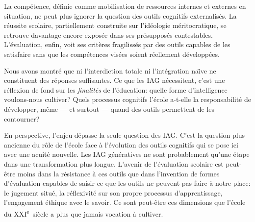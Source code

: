 La comp\'etence, d\'efinie comme mobilisation de ressources internes et externes en situation, ne peut plus ignorer la question des outils cognitifs externalis\'es. 
La r\'eussite scolaire, partiellement construite sur l'id\'eologie m\'eritocratique, se retrouve davantage encore expos\'ee dans ses pr\'esuppos\'es contestables. 
L'\'evaluation, enfin, voit ses crit\`eres fragiliss\'es par des outils capables de les satisfaire sans que les comp\'etences vis\'ees soient r\'eellement d\'evelopp\'ees.

Nous avons montr\'e que ni l'interdiction totale ni l'int\'egration na\"\i ve ne constituent des r\'eponses suffisantes. 
Ce que les IAG n\'ecessitent, c'est une r\'eflexion de fond sur les \emph{finalit\'es} de l'\'education: quelle forme d'intelligence voulons-nous cultiver?
Quels processus cognitifs l'\'ecole a-t-elle la responsabilit\'e de d\'evelopper, m\^eme --- et surtout --- quand des outils permettent de les contourner?

En perspective, l'enjeu d\'epasse la seule question des IAG.\@
C'est la question plus ancienne du r\^ole de l'\'ecole face \`a l'\'evolution des outils cognitifs qui se pose ici avec une acuit\'e nouvelle. 
Les IAG g\'en\'eratives ne sont probablement qu'une \'etape dans une transformation plus longue. 
L'avenir de l'\'evaluation scolaire est peut-\^etre moins dans la r\'esistance \`a ces outils que dans l'invention de formes d'\'evaluation capables de saisir ce que les outils ne peuvent pas faire \`a notre place: le jugement situ\'e, la r\'eflexivit\'e sur son propre processus d'apprentissage, l'engagement \'ethique avec le savoir. 
Ce sont peut-\^etre ces dimensions que l'\'ecole du XXI\textsuperscript{e}~si\`ecle a plus que jamais vocation \`a cultiver.


